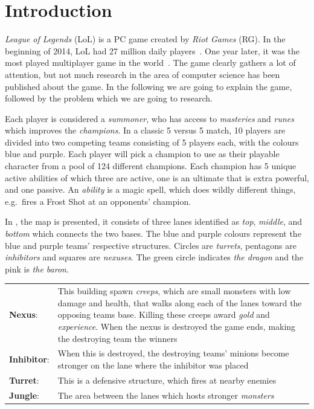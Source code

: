 \section{Introduction}\label{sec:intro}


\emph{League of Legends} (LoL) is a PC game created by \emph{Riot Games} (RG). In the beginning of 2014, LoL had 27 million daily players~\cite{LoL27mill}. One year later, it was the most played multiplayer game in the world~\cite{LoLmostplayed}. The game clearly gathers a lot of attention, but not much research in the area of computer science has been published about the game. In the following we are going to explain the game, followed by the problem which we are going to research. 

Each player is considered a \emph{summoner}, who has access to \emph{masteries} and \emph{runes} which improves the \emph{champions}. In a classic 5 versus 5 match, 10 players are divided into two competing teams consisting of 5 players each, with the colours blue and purple. Each player will pick a champion to use as their playable character from a pool of 124 different champions. Each champion has 5 unique active abilities of which three are active, one is an ultimate that is extra powerful, and one passive. An \emph{ability} is a magic spell, which does wildly different things, e.g.\ fires a Frost Shot at an opponents' champion. 

In , the map is presented, it consists of three lanes identified as \emph{top}, \emph{middle}, and \emph{bottom} which connects the two bases. The blue and purple colours represent the blue and purple teams' respective structures. Circles are \emph{turrets}, pentagons are \emph{inhibitors} and squares are \emph{nexuses}. The green circle indicates \emph{the dragon} and the pink is \emph{the baron}.

\begin{table}[!h]
  \begin{tabular}{l p{13cm}}
    \textbf{Nexus}: & This building spawn \emph{creeps}, which are small monsters with low damage and health, that walks along each of the lanes toward the opposing teams base. Killing these creeps award \emph{gold} and \emph{experience}. When the nexus is destroyed the game ends, making the destroying team the winners\\
    \textbf{Inhibitor}: & When this is destroyed, the destroying teams' minions become stronger on the lane where the inhibitor was placed\\
    \textbf{Turret}: & This is a defensive structure, which fires at nearby enemies\\
    \textbf{Jungle}: & The area between the lanes which hosts stronger \emph{monsters}\\
  \end{tabular}
\end{table}

